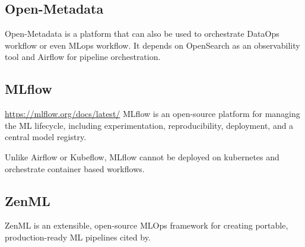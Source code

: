 \subsection{Open-Metadata}\label{subsec:openmetadata}
Open-Metadata is a platform that can also be used to orchestrate DataOps workflow or even MLops workflow.
It depends on OpenSearch as an observability tool and Airflow for pipeline orchestration.

\subsection{MLflow}\url{https://mlflow.org/docs/latest/}
MLflow is an open-source platform for managing the ML lifecycle, including experimentation, reproducibility,
deployment, and a central model registry.\cite{mlflow}

Unlike Airflow or Kubeflow, MLflow cannot be deployed on kubernetes and orchestrate container based workflows.

\subsection{ZenML}
ZenML is an extensible, open-source MLOps framework for creating portable, production-ready ML pipelines cited by\cite{blockchain-mlops}.

